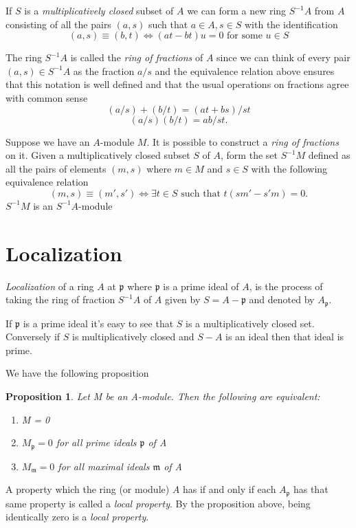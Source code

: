 \documentclass[]{report}
\newtheorem{prop}[theorem]{Proposition}
\newcommand\byS{S^{-1}}
\newcommand\mfk[1]{\mathfrak{#1}}
\begin{document}
If $S$ is a \textit{multiplicatively closed} subset of $A$ we can form a new ring $\byS A$ from $A$ consisting of all the pairs $(a,s)$ such that $a\in A, s\in S$ with the identification
    $$(a,s) \equiv (b,t) \Leftrightarrow (at - bt)u = 0 \text{ for some } u \in S$$

    The ring $\byS A$ is called the \textit{ring of fractions} of $A$ since we can think of every pair $(a,s) \in \byS A$ as the fraction $a/s$ and the equivalence relation above ensures that this notation is well defined and that the usual operations on fractions agree with common sense
    $$(a/s) + (b/t) = (at + bs)/st$$
    $$(a/s)(b/t) = ab/st.$$

    Suppose we have an $A$-module $M$. It is possible to construct a \textit{ring of fractions} on it. Given a multiplicatively closed subset $S$ of $A$, form the set $\byS M$ defined as all the pairs of elements $(m,s)$ where $m \in M$ and $s \in S$ with the following equivalence relation 
    $$(m,s) \equiv (m', s') \Leftrightarrow \exists t \in S \text{ such that } t(sm' - s'm) = 0.$$
$\byS M$ is an $\byS A$-module

\section{Localization}

\textit{Localization} of a ring $A$ at $\mfk{p}$ where $\mfk{p}$ is a prime ideal of $A$, is the process of taking the ring of fraction $\byS A$ of $A$ given by $S = A - \mfk{p}$ and denoted by $A_\mfk{p}$.

If $\mfk{p}$ is a prime ideal it's easy to see that $S$ is a multiplicatively closed set. Conversely if $S$ is multiplicatively closed and $S - A$ is an ideal then that ideal is prime.

We have the following proposition
\begin{prop}
    Let M be an A-module. Then the following are equivalent:
    \begin{enumerate}
        \item M = 0
        \item $M_\mathfrak{p} = 0$ for all prime ideals $\mathfrak{p}$ of A
        \item $M_\mathfrak{m} = 0$ for all maximal ideals $\mathfrak{m}$ of A
    \end{enumerate}
\end{prop}

A property which the ring (or module) $A$ has if and only if each $A_\mfk{p}$ has that same property is called a \textit{local property}. By the proposition above, being identically zero is a \textit{local property}.
\end{document}
